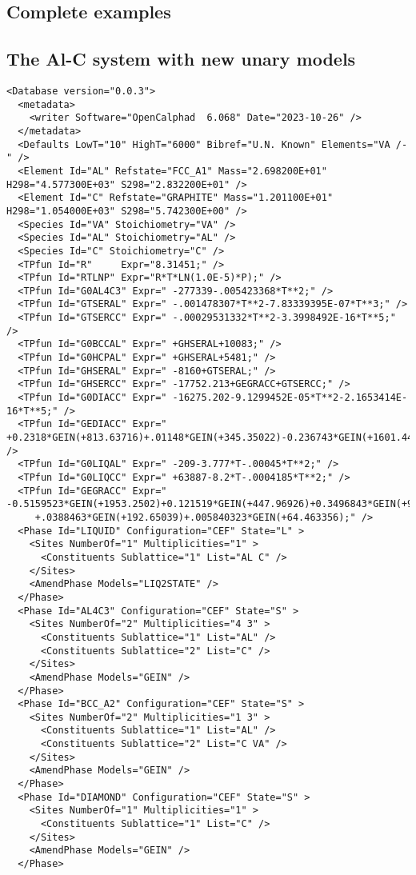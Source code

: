 \documentclass{article}
\begin{document}
\begin{appendices}
\setcounter{equation}{0}
\renewcommand{\theequation}{D\arabic{equation}}
\setcounter{figure}{0}
\renewcommand{\thefigure}{D\arabic{figure}}

\section{Complete examples}\label{sec:complete}

\subsection{The Al-C system with new unary models}\label{sec:alc}

{\small
\begin{verbatim}
<Database version="0.0.3">
  <metadata>
    <writer Software="OpenCalphad  6.068" Date="2023-10-26" />
  </metadata>
  <Defaults LowT="10" HighT="6000" Bibref="U.N. Known" Elements="VA /-" />
  <Element Id="AL" Refstate="FCC_A1" Mass="2.698200E+01" H298="4.577300E+03" S298="2.832200E+01" />
  <Element Id="C" Refstate="GRAPHITE" Mass="1.201100E+01" H298="1.054000E+03" S298="5.742300E+00" />
  <Species Id="VA" Stoichiometry="VA" />
  <Species Id="AL" Stoichiometry="AL" />
  <Species Id="C" Stoichiometry="C" />
  <TPfun Id="R"     Expr="8.31451;" />
  <TPfun Id="RTLNP" Expr="R*T*LN(1.0E-5)*P);" />
  <TPfun Id="G0AL4C3" Expr=" -277339-.005423368*T**2;" /> 
  <TPfun Id="GTSERAL" Expr=" -.001478307*T**2-7.83339395E-07*T**3;" /> 
  <TPfun Id="GTSERCC" Expr=" -.00029531332*T**2-3.3998492E-16*T**5;" /> 
  <TPfun Id="G0BCCAL" Expr=" +GHSERAL+10083;" /> 
  <TPfun Id="G0HCPAL" Expr=" +GHSERAL+5481;" /> 
  <TPfun Id="GHSERAL" Expr=" -8160+GTSERAL;" /> 
  <TPfun Id="GHSERCC" Expr=" -17752.213+GEGRACC+GTSERCC;" /> 
  <TPfun Id="G0DIACC" Expr=" -16275.202-9.1299452E-05*T**2-2.1653414E-16*T**5;" /> 
  <TPfun Id="GEDIACC" Expr=" +0.2318*GEIN(+813.63716)+.01148*GEIN(+345.35022)-0.236743*GEIN(+1601.4467);" /> 
  <TPfun Id="G0LIQAL" Expr=" -209-3.777*T-.00045*T**2;" /> 
  <TPfun Id="G0LIQCC" Expr=" +63887-8.2*T-.0004185*T**2;" /> 
  <TPfun Id="GEGRACC" Expr=" -0.5159523*GEIN(+1953.2502)+0.121519*GEIN(+447.96926)+0.3496843*GEIN(+947.01605)
     +.0388463*GEIN(+192.65039)+.005840323*GEIN(+64.463356);" /> 
  <Phase Id="LIQUID" Configuration="CEF" State="L" >
    <Sites NumberOf="1" Multiplicities="1" >
      <Constituents Sublattice="1" List="AL C" />
    </Sites>
    <AmendPhase Models="LIQ2STATE" />
  </Phase>
  <Phase Id="AL4C3" Configuration="CEF" State="S" >
    <Sites NumberOf="2" Multiplicities="4 3" >
      <Constituents Sublattice="1" List="AL" />
      <Constituents Sublattice="2" List="C" />
    </Sites>
    <AmendPhase Models="GEIN" />
  </Phase>
  <Phase Id="BCC_A2" Configuration="CEF" State="S" >
    <Sites NumberOf="2" Multiplicities="1 3" >
      <Constituents Sublattice="1" List="AL" />
      <Constituents Sublattice="2" List="C VA" />
    </Sites>
    <AmendPhase Models="GEIN" />
  </Phase>
  <Phase Id="DIAMOND" Configuration="CEF" State="S" >
    <Sites NumberOf="1" Multiplicities="1" >
      <Constituents Sublattice="1" List="C" />
    </Sites>
    <AmendPhase Models="GEIN" />
  </Phase>



\end{verbatim}}
\end{appendices}
\end{document}

